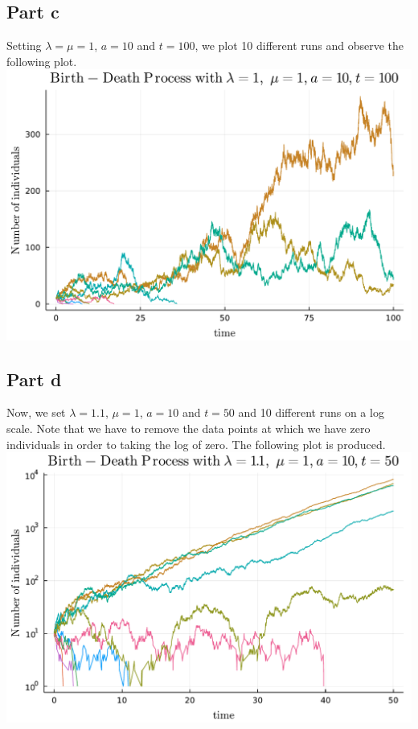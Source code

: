 \documentclass{article}
\begin{document}
\subsection{Part c}
Setting $\lambda=\mu=1$, $a=10$ and $t=100$, we plot 10 different runs and observe the following plot. \\
\includegraphics[scale=0.5]{pc.pdf}\\

\subsection{Part d}
Now, we set $\lambda=1.1$, $\mu=1$, $a=10$ and $t=50$ and 10 different runs on a log scale. Note that we have to remove the data points at which we have zero individuals in order to taking the log of zero. The following plot is produced. \\
\includegraphics[scale=0.5]{pd.pdf}\\
\end{document}
